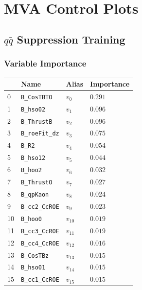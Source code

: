 \chapter{MVA Control Plots}\label{sec:mva-control-plots}
\section{\texorpdfstring{$q \bar q$}{Continuum} Suppression Training}

\subsection{Variable Importance}

\begin{longtable}{| p{} | p{} | p{} |p{} |}
\hline
& Name & Alias & Importance \\ \hline
0 &\texttt{\footnotesize B\_CosTBTO} & $v_{0}$ & $0.291$ \\ \hline
1 &\texttt{\footnotesize B\_hso02} & $v_{1}$ & $0.096$ \\ \hline
2 &\texttt{\footnotesize B\_ThrustB} & $v_{2}$ & $0.096$ \\ \hline
3 &\texttt{\footnotesize B\_roeFit\_dz} & $v_{3}$ & $0.075$ \\ \hline
4 &\texttt{\footnotesize B\_R2} & $v_{4}$ & $0.054$ \\ \hline
5 &\texttt{\footnotesize B\_hso12} & $v_{5}$ & $0.044$ \\ \hline
6 &\texttt{\footnotesize B\_hoo2} & $v_{6}$ & $0.032$ \\ \hline
7 &\texttt{\footnotesize B\_ThrustO} & $v_{7}$ & $0.027$ \\ \hline
8 &\texttt{\footnotesize B\_qpKaon} & $v_{8}$ & $0.024$ \\ \hline
9 &\texttt{\footnotesize B\_cc2\_CcROE} & $v_{9}$ & $0.023$ \\ \hline
10 &\texttt{\footnotesize B\_hoo0} & $v_{10}$ & $0.019$ \\ \hline
11 &\texttt{\footnotesize B\_cc3\_CcROE} & $v_{11}$ & $0.019$ \\ \hline
12 &\texttt{\footnotesize B\_cc4\_CcROE} & $v_{12}$ & $0.016$ \\ \hline
13 &\texttt{\footnotesize B\_CosTBz} & $v_{13}$ & $0.015$ \\ \hline
14 &\texttt{\footnotesize B\_hso01} & $v_{14}$ & $0.015$ \\ \hline
15 &\texttt{\footnotesize B\_cc1\_CcROE} & $v_{15}$ & $0.015$ \\ \hline

\end{longtable}
